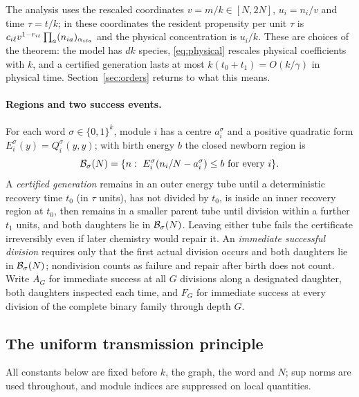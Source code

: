 The analysis uses the rescaled coordinates $v=m/k\in[N,2N]$, $u_i=n_i/v$ and time $\tau=t/k$; in these coordinates the resident propensity per unit $\tau$ is $c_{i\ell}v^{1-r_{i\ell}}\prod_a(n_{ia})_{\alpha_{i\ell a}}$ and the physical concentration is $u_i/k$. These are choices of the theorem: the model has $dk$ species, \eqref{eq:physical} rescales physical coefficients with $k$, and a certified generation lasts at most $k(t_0+t_1)=O(k/\gamma)$ in physical time. Section~\ref{sec:orders} returns to what this means.

\paragraph{Regions and two success events.}
For each word $\sigma\in\{0,1\}^k$, module $i$ has a centre $a_i^\sigma$ and a positive quadratic form $E_i^\sigma(y)=Q_i^\sigma(y,y)$; with birth energy $b$ the closed newborn region is
\begin{equation}\label{eq:birthregion}
 \mathcal B_\sigma(N)=\{n:\ E_i^\sigma(n_i/N-a_i^\sigma)\le b\ \text{for every }i\}.
\end{equation}
A \emph{certified generation} remains in an outer energy tube until a deterministic recovery time $t_0$ (in $\tau$ units), has not divided by $t_0$, is inside an inner recovery region at $t_0$, then remains in a smaller parent tube until division within a further $t_1$ units, and both daughters lie in $\mathcal B_\sigma(N)$. Leaving either tube fails the certificate irreversibly even if later chemistry would repair it. An \emph{immediate successful division} requires only that the first actual division occurs and both daughters lie in $\mathcal B_\sigma(N)$; nondivision counts as failure and repair after birth does not count. Write $A_G$ for immediate success at all $G$ divisions along a designated daughter, both daughters inspected each time, and $F_G$ for immediate success at every division of the complete binary family through depth $G$.

\subsection{The uniform transmission principle}\label{sec:general}
All constants below are fixed before $k$, the graph, the word and $N$; sup norms are used throughout, and module indices are suppressed on local quantities.

